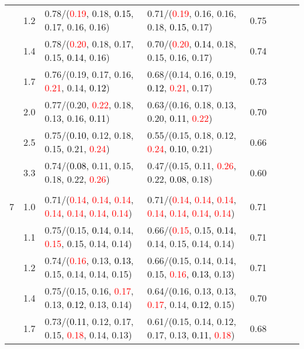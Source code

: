 \documentclass[10pt,a4paper]{report}
\begin{document}
\begin{table}[!htbp]
\begin{center}
{\begin{tabular}{ccllcccc}
			&1.2&0.78/(\textcolor{red}{0.19}, 0.18, \textcolor{black}{0.15}, 0.17, 0.16, 0.16)&0.71/(\textcolor{red}{0.19}, 0.16, 0.16, 0.18, \textcolor{black}{0.15}, 0.17)&0.75\\
			&1.4&0.78/(\textcolor{red}{0.20}, 0.18, 0.17, 0.15, \textcolor{black}{0.14}, 0.16)&0.70/(\textcolor{red}{0.20}, \textcolor{black}{0.14}, 0.18, 0.15, 0.16, 0.17)&0.74\\
			&1.7&0.76/(0.19, 0.17, 0.16, \textcolor{red}{0.21}, 0.14, \textcolor{black}{0.12})&0.68/(0.14, 0.16, 0.19, \textcolor{black}{0.12}, \textcolor{red}{0.21}, 0.17)&0.73\\
			&2.0&0.77/(0.20, \textcolor{red}{0.22}, 0.18, 0.13, 0.16, \textcolor{black}{0.11})&0.63/(0.16, 0.18, 0.13, 0.20, \textcolor{black}{0.11}, \textcolor{red}{0.22})&0.70\\
			&2.5&0.75/(\textcolor{black}{0.10}, 0.12, 0.18, 0.15, 0.21, \textcolor{red}{0.24})&0.55/(0.15, 0.18, 0.12, \textcolor{red}{0.24}, \textcolor{black}{0.10}, 0.21)&0.66\\
			&3.3&0.74/(\textcolor{black}{0.08}, 0.11, 0.15, 0.18, 0.22, \textcolor{red}{0.26})&0.47/(0.15, 0.11, \textcolor{red}{0.26}, 0.22, \textcolor{black}{0.08}, 0.18)&0.60\\
			&&&&\\
			7			&1.0&0.71/(\textcolor{red}{0.14}, \textcolor{red}{0.14}, \textcolor{red}{0.14}, \textcolor{red}{0.14}, \textcolor{red}{0.14}, \textcolor{red}{0.14}, \textcolor{red}{0.14})&0.71/(\textcolor{red}{0.14}, \textcolor{red}{0.14}, \textcolor{red}{0.14}, \textcolor{red}{0.14}, \textcolor{red}{0.14}, \textcolor{red}{0.14}, \textcolor{red}{0.14})&0.71\\
			&1.1&0.75/(0.15, \textcolor{black}{0.14}, 0.14, \textcolor{red}{0.15}, 0.15, 0.14, 0.14)&0.66/(\textcolor{red}{0.15}, 0.15, \textcolor{black}{0.14}, 0.14, 0.15, 0.14, 0.14)&0.71\\
			&1.2&0.74/(\textcolor{red}{0.16}, 0.13, \textcolor{black}{0.13}, 0.15, 0.14, 0.14, 0.15)&0.66/(0.15, 0.14, 0.14, 0.15, \textcolor{red}{0.16}, \textcolor{black}{0.13}, 0.13)&0.71\\
			&1.4&0.75/(0.15, 0.16, \textcolor{red}{0.17}, 0.13, \textcolor{black}{0.12}, 0.13, 0.14)&0.64/(0.16, 0.13, 0.13, \textcolor{red}{0.17}, 0.14, \textcolor{black}{0.12}, 0.15)&0.70\\
			&1.7&0.73/(\textcolor{black}{0.11}, 0.12, 0.17, 0.15, \textcolor{red}{0.18}, 0.14, 0.13)&0.61/(0.15, 0.14, 0.12, 0.17, 0.13, \textcolor{black}{0.11}, \textcolor{red}{0.18})&0.68\\

\end{tabular}}
\end{center}
\end{table}
\end{document}
